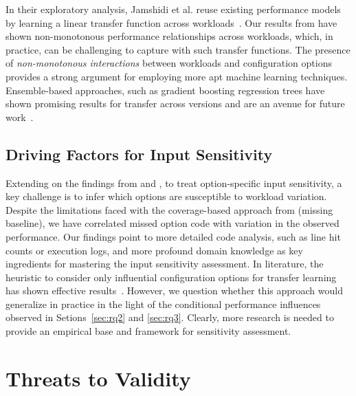 In their exploratory analysis, Jamshidi et al. reuse existing performance models by learning a linear transfer function across workloads~\cite{jamishidi_transfer_2017}. Our results from  have shown non-monotonous performance relationships across workloads, which, in practice, can be challenging to capture with such transfer functions. The presence of \textit{non-monotonous interactions} between workloads and configuration options provides a strong argument for employing more apt machine learning techniques. Ensemble-based approaches, such as gradient boosting regression trees have shown promising results for transfer across versions and are an avenue for future work~\cite{martin_transfer_2021}.


\subsection{Driving Factors for Input Sensitivity}
Extending on the findings from  and , to treat option-specific input sensitivity, a key challenge is to infer which options are susceptible to workload variation. Despite the limitations faced with the coverage-based approach from  (missing baseline), we have correlated missed option code with variation in the observed performance. Our findings point to more detailed code analysis, such as line hit counts or execution logs, and more profound domain knowledge as key ingredients for mastering the input sensitivity assessment. In literature, the heuristic to consider only influential configuration options for transfer learning has shown effective results~\cite{jamshidi_learning_2018}. However, we question whether this approach would generalize in practice in the light of the conditional performance influences observed in Setions~\ref{sec:rq2} and \ref{sec:rq3}. Clearly, more research is needed to provide an empirical base and framework for sensitivity assessment.


\section{Threats to Validity}\label{sec:threats}

